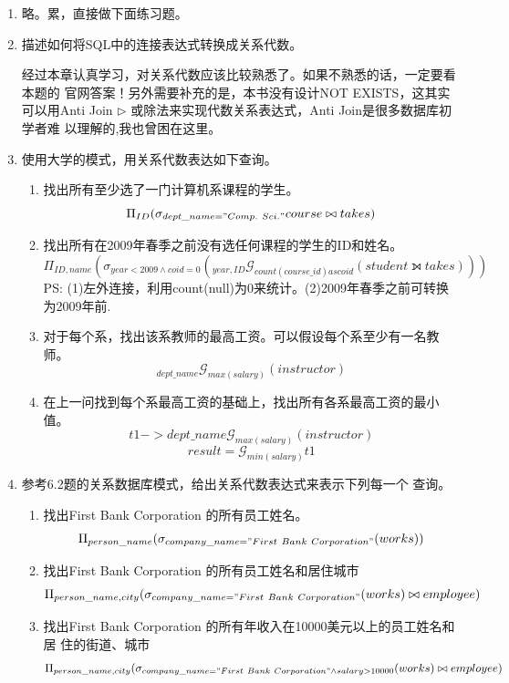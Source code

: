 \documentclass{dingjia}
\begin{document}
\begin{enumerate}
\item 略。累，直接做下面练习题。

\item 描述如何将SQL中的连接表达式转换成关系代数。

  经过本章认真学习，对关系代数应该比较熟悉了。如果不熟悉的话，一定要看本题的
  官网答案！另外需要补充的是，本书没有设计NOT EXISTS，这其实可以用Anti Join
  $\triangleright$ 或除法来实现代数关系表达式，Anti Join是很多数据库初学者难
  以理解的,我也曾困在这里。

\item 使用大学的模式，用关系代数表达如下查询。
  \begin{enumerate}
  \item  找出所有至少选了一门计算机系课程的学生。
    \[ \Pi_{ID}(\sigma_{dept\_name = "Comp.\ Sci."}course \bowtie takes) \]

  \item 找出所有在2009年春季之前没有选任何课程的学生的ID和姓名。
    \[\Pi_{ID,name}(\sigma_{year <
        2009 \land coid = 0}(_{year,ID}\mathcal{G}_{count(course\_id) as coid}(student ⟕ takes)))\]
    PS: (1)左外连接，利用count(null)为0来统计。(2)2009年春季之前可转换为2009年前.

  \item 对于每个系，找出该系教师的最高工资。可以假设每个系至少有一名教师。
    \[ _{dept\_name}\mathcal{G}_{max(salary)}(instructor) \]

  \item 在上一问找到每个系最高工资的基础上，找出所有各系最高工资的最小值。
    \[ t1 ->{dept\_name}\mathcal{G}_{max(salary)}(instructor) \]
    \[result = \mathcal{G}_{min(salary)}t1 \]
  \end{enumerate}

\item 参考6.2题的关系数据库模式，给出关系代数表达式来表示下列每一个
  查询。

  \begin{enumerate}
  \item 找出First Bank Corporation 的所有员工姓名。
    \[ \Pi_{person\_name}(\sigma_{company\_name = "First\ Bank\ Corporation"}(works)) \]

  \item 找出First Bank Corporation 的所有员工姓名和居住城市
    \[ \Pi_{person\_name, city}(\sigma_{company\_name = "First\ Bank\ Corporation"}(works) \bowtie employee) \]

  \item 找出First Bank Corporation 的所有年收入在10000美元以上的员工姓名和居
    住的街道、城市
    \[ \Pi_{person\_name, city}(\sigma_{company\_name = "First\ Bank\ Corporation" \land salary > 10000}(works) \bowtie employee) \]


\end{enumerate}
\end{enumerate}
\end{document}
